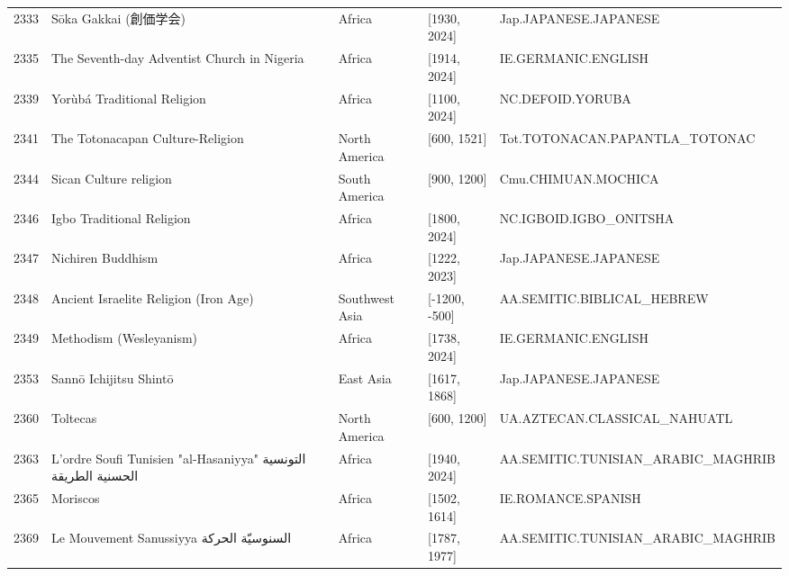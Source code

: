 {\begin{longtable}{rp{3.5cm}llp{3.5cm}}
2333 & {\raggedright Sōka Gakkai (創価学会)} & Africa & [1930, 2024] & {\raggedright Jap.\allowbreak{}JAPANESE.\allowbreak{}JAPANESE} \\
2335 & {\raggedright The Seventh-day Adventist Church in Nigeria} & Africa & [1914, 2024] & {\raggedright IE.\allowbreak{}GERMANIC.\allowbreak{}ENGLISH} \\
2339 & {\raggedright Yorùbá Traditional Religion} & Africa & [1100, 2024] & {\raggedright NC.\allowbreak{}DEFOID.\allowbreak{}YORUBA} \\
2341 & {\raggedright The Totonacapan Culture-Religion} & North America & [600, 1521] & {\raggedright Tot.\allowbreak{}TOTONACAN.\allowbreak{}PAPANTLA\_\allowbreak{}TOTONAC} \\
2344 & {\raggedright Sican Culture religion} & South America & [900, 1200] & {\raggedright Cmu.\allowbreak{}CHIMUAN.\allowbreak{}MOCHICA} \\
2346 & {\raggedright Igbo Traditional Religion} & Africa & [1800, 2024] & {\raggedright NC.\allowbreak{}IGBOID.\allowbreak{}IGBO\_\allowbreak{}ONITSHA} \\
2347 & {\raggedright Nichiren Buddhism} & Africa & [1222, 2023] & {\raggedright Jap.\allowbreak{}JAPANESE.\allowbreak{}JAPANESE} \\
2348 & {\raggedright Ancient Israelite Religion (Iron Age)} & Southwest Asia & [-1200, -500] & {\raggedright AA.\allowbreak{}SEMITIC.\allowbreak{}BIBLICAL\_\allowbreak{}HEBREW} \\
2349 & {\raggedright Methodism (Wesleyanism)} & Africa & [1738, 2024] & {\raggedright IE.\allowbreak{}GERMANIC.\allowbreak{}ENGLISH} \\
2353 & {\raggedright Sannō Ichijitsu Shintō} & East Asia & [1617, 1868] & {\raggedright Jap.\allowbreak{}JAPANESE.\allowbreak{}JAPANESE} \\
2360 & {\raggedright Toltecas} & North America & [600, 1200] & {\raggedright UA.\allowbreak{}AZTECAN.\allowbreak{}CLASSICAL\_\allowbreak{}NAHUATL} \\
2363 & {\raggedright L'ordre Soufi Tunisien "al-Hasaniyya" {\arabicfont التونسية الحسنية الطريقة}} & Africa & [1940, 2024] & {\raggedright AA.\allowbreak{}SEMITIC.\allowbreak{}TUNISIAN\_\allowbreak{}ARABIC\_\allowbreak{}MAGHRIB} \\
2365 & {\raggedright Moriscos} & Africa & [1502, 1614] & {\raggedright IE.\allowbreak{}ROMANCE.\allowbreak{}SPANISH} \\
2369 & {\raggedright Le Mouvement Sanussiyya {\arabicfont السنوسيّة الحركة}} & Africa & [1787, 1977] & {\raggedright AA.\allowbreak{}SEMITIC.\allowbreak{}TUNISIAN\_\allowbreak{}ARABIC\_\allowbreak{}MAGHRIB} \\

\end{longtable}}
